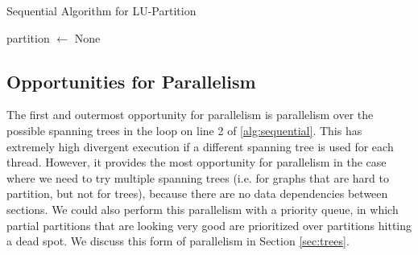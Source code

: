 \documentclass[11pt]{article}
\begin{document}
{\footnotesize
\begin{algorithm}[H]
\DontPrintSemicolon
\caption{Sequential Algorithm for LU-Partition}\label{alg:sequential}


partition $\gets$ None\;
\end{algorithm}
}

\subsection{Opportunities for Parallelism}

The first and outermost opportunity for parallelism is parallelism over the possible spanning trees in the loop on line 2 of \ref{alg:sequential}.
This has extremely high divergent execution if a different spanning tree is used for each thread.
However, it provides the most opportunity for parallelism in the case where we need to try multiple spanning trees (i.e. for graphs that are hard to partition, but not for trees), because there are no data dependencies between sections.
We could also perform this parallelism with a priority queue, in which partial partitions that are looking very good are prioritized over partitions hitting a dead spot.
We discuss this form of parallelism in Section \ref{sec:trees}.
\end{document}
